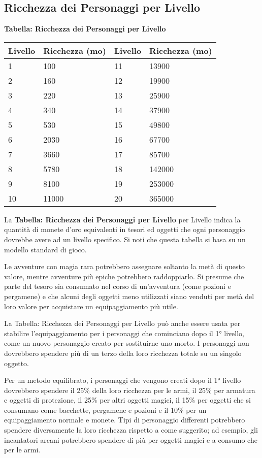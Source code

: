 \begin{multicols}{2}
\subsection{Ricchezza dei Personaggi per Livello}

\textbf{Tabella: Ricchezza dei Personaggi per Livello}

\medskip

\noindent\begin{tabularx}{\linewidth}{XX|XX}
	\toprule
\textbf{Livello} & \textbf{Ricchezza (mo)} & \textbf{Livello} & \textbf{Ricchezza (mo)}\\
\toprule
1 & 100 & 11 & 13900\\
2 & 160 & 12 & 19900\\
3 & 220 & 13 & 25900\\
4 & 340 & 14 & 37900\\
5 & 530 & 15 & 49800\\
6 & 2030 & 16 & 67700\\
7 & 3660 & 17 & 85700\\
8 & 5780 & 18 & 142000\\
9 & 8100 & 19 & 253000\\
10 & 11000 & 20 & 365000
\end{tabularx}

\medskip

La \textbf{Tabella: Ricchezza dei Personaggi per Livello} per Livello indica la quantità di monete d'oro equivalenti in tesori ed oggetti che ogni personaggio dovrebbe avere ad un livello specifico. Si noti che questa tabella si basa su un modello standard di gioco.

Le avventure con magia rara potrebbero assegnare soltanto la metà di questo valore, mentre avventure più epiche potrebbero raddoppiarlo. Si presume che parte del tesoro sia consumato nel corso di un'avventura (come pozioni e pergamene) e che alcuni degli oggetti meno utilizzati siano venduti per metà del loro valore per acquistare un equipaggiamento più utile.

La Tabella: Ricchezza dei Personaggi per Livello può anche essere usata per stabilire l'equipaggiamento per i personaggi che cominciano dopo il 1° livello, come un nuovo personaggio creato per sostituirne uno morto. I personaggi non dovrebbero spendere più di un terzo della loro ricchezza totale su un singolo oggetto.

Per un metodo equilibrato, i personaggi che vengono creati dopo il 1° livello dovrebbero spendere il 25\% della loro ricchezza per le armi, il 25\% per armatura e oggetti di protezione, il 25\% per altri oggetti magici, il 15\% per oggetti che si consumano come bacchette, pergamene e pozioni e il 10\% per un equipaggiamento normale e monete. Tipi di personaggio differenti potrebbero spendere diversamente la loro ricchezza rispetto a come suggerito; ad esempio, gli incantatori arcani potrebbero spendere di più per oggetti magici e a consumo che per le armi.


\end{multicols}
